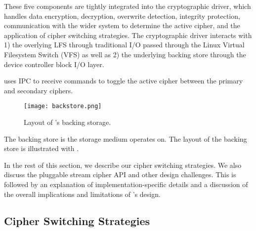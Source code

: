 These five components are tightly integrated into the cryptographic driver,
which handles data encryption, decryption, overwrite detection, integrity
protection, communication with the wider system to determine the active cipher,
and the application of cipher switching strategies. The cryptographic driver
interacts with 1) the overlying LFS through traditional I/O passed through the
Linux Virtual Filesystem Switch (VFS) as well as 2) the underlying backing store
through the device controller block I/O layer.

\SYSTEM{} uses IPC to receive commands to toggle the active cipher between the
primary and secondary ciphers. 

\begin{figure}[t]
 \centering
  \texttt{[image: backstore.png]}
   \caption{Layout of \SYSTEM{}'s backing storage.}\label{fig:backstore}
\end{figure}

The backing store is the storage medium \SYSTEM{} operates on. The layout of the
backing store is illustrated with . 

In the rest of this section, we describe our cipher switching strategies. We
also discuss the pluggable stream cipher API and other design challenges. This
is followed by an explanation of implementation-specific details and a
discussion of the overall implications and limitations of \SYSTEM{}'s design.

\subsection{Cipher Switching Strategies}


